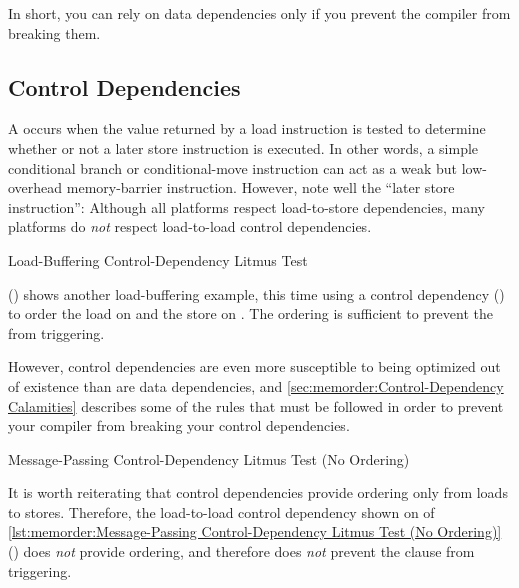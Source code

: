 In short, you can rely on data dependencies only if you prevent the
compiler from breaking them.

\subsection{Control Dependencies}
\label{sec:memorder:Control Dependencies}

A \emph{} occurs when the value returned by a load
instruction is tested to determine whether or not a later store instruction
is executed.
In other words, a simple conditional branch or conditional-move
instruction can act as a weak but low-overhead memory-barrier instruction.
However, note well the ``later store instruction'':
Although all platforms respect load-to-store dependencies, many platforms
do \emph{not} respect load-to-load control dependencies.

\begin{listing}

\caption{Load-Buffering Control-Dependency Litmus Test}
\label{lst:memorder:Load-Buffering Control-Dependency Litmus Test}
\end{listing}

\begin{fcvref}
()
shows another load-buffering example, this time using a control
dependency () to order the load on  and the store on
.
The ordering is sufficient to prevent the  from triggering.
\end{fcvref}

However, control dependencies are even more susceptible to being optimized
out of existence than are data dependencies, and
\cref{sec:memorder:Control-Dependency Calamities}
describes some of the rules that must be followed in order to prevent
your compiler from breaking your control dependencies.

\begin{listing}

\caption{Message-Passing Control-Dependency Litmus Test (No Ordering)}
\label{lst:memorder:Message-Passing Control-Dependency Litmus Test (No Ordering)}
\end{listing}

\begin{fcvref}
It is worth reiterating that control dependencies provide ordering only
from loads to stores.
Therefore, the load-to-load control dependency shown on  of
\cref{lst:memorder:Message-Passing Control-Dependency Litmus Test (No Ordering)}
()
does \emph{not} provide ordering, and therefore does \emph{not}
prevent the  clause from triggering.
\end{fcvref}

